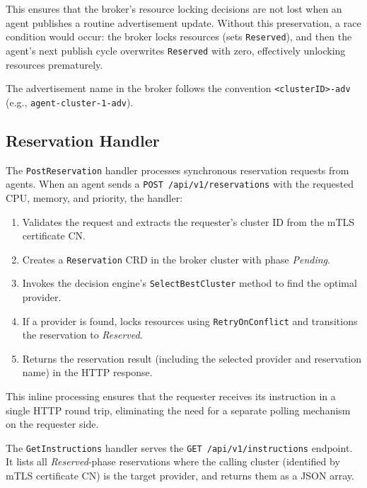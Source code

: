 This ensures that the broker's resource locking decisions are not lost when an agent publishes a routine advertisement update. Without this preservation, a race condition would occur: the broker locks resources (sets \texttt{Reserved}), and then the agent's next publish cycle overwrites \texttt{Reserved} with zero, effectively unlocking resources prematurely.

The advertisement name in the broker follows the convention \texttt{<clusterID>-adv} (e.g., \texttt{agent-cluster-1-adv}).

\subsection{Reservation Handler}
\label{subsec:reservation-handler}

The \texttt{PostReservation} handler processes synchronous reservation requests from agents. When an agent sends a \texttt{POST /api/v1/reservations} with the requested CPU, memory, and priority, the handler:

\begin{enumerate}
    \item Validates the request and extracts the requester's cluster ID from the mTLS certificate CN.
    \item Creates a \texttt{Reservation} CRD in the broker cluster with phase \textit{Pending}.
    \item Invokes the decision engine's \texttt{SelectBestCluster} method to find the optimal provider.
    \item If a provider is found, locks resources using \texttt{RetryOnConflict} and transitions the reservation to \textit{Reserved}.
    \item Returns the reservation result (including the selected provider and reservation name) in the HTTP response.
\end{enumerate}

This inline processing ensures that the requester receives its instruction in a single HTTP round trip, eliminating the need for a separate polling mechanism on the requester side.

The \texttt{GetInstructions} handler serves the \texttt{GET /api/v1/instructions} endpoint. It lists all \textit{Reserved}-phase reservations where the calling cluster (identified by mTLS certificate CN) is the target provider, and returns them as a JSON array.

